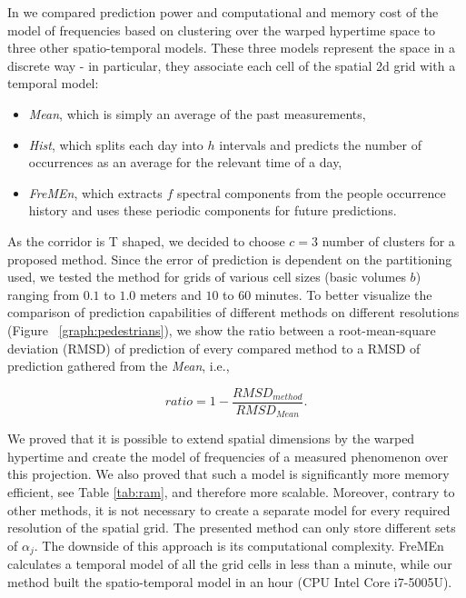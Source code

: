 In \cite{Vintr2019Spatio} we compared prediction power and computational and memory cost of the model of frequencies based on clustering over the warped hypertime space to three other spatio-temporal models. 
These three models represent the space in a discrete way - in particular, they associate each cell of the spatial 2d grid with a temporal model: 
\begin{itemize}
    \item \textit{Mean}, which is simply an average of the past measurements, 
    \item \textit{Hist}, which splits each day into $h$ intervals and predicts the number of occurrences as an average for the relevant time of a day, 
    \item \textit{FreMEn}, which extracts $f$ spectral components from the people occurrence history and uses these periodic components for future predictions.
\end{itemize}
As the corridor is T shaped, we decided to choose $c = 3$ number of clusters for a proposed method. 
Since the error of prediction is dependent on the partitioning used, we tested the method for grids of various cell sizes (basic volumes $b$) ranging from $0.1$ to $1.0$ meters and $10$ to $60$ minutes.
To better visualize the comparison of prediction capabilities of different methods on different resolutions (Figure ~\ref{graph:pedestrians}), we show the ratio between a root-mean-square deviation \cite{hyndman2006another} (RMSD) of prediction of every compared method to a RMSD of prediction gathered from the \textit{Mean}, i.e.,

\begin{equation}\label{eq:ratio}
ratio = 1 - \frac{RMSD_{method}}{RMSD_{Mean}}.
\end{equation}



We proved that it is possible to extend spatial dimensions by the warped hypertime and create the model of frequencies of a measured phenomenon over this projection.
We also proved that such a model is significantly more memory efficient, see Table \ref{tab:ram},  and therefore more scalable.
Moreover, contrary to other methods, it is not necessary to create a separate model for every required resolution of the spatial grid.
The presented method can only store different sets of $\alpha_{j}$.  
The downside of this approach is its computational complexity.
FreMEn calculates a temporal model of all the grid cells in less than a minute, while our method built the spatio-temporal model in an hour (CPU Intel Core i7-5005U).



